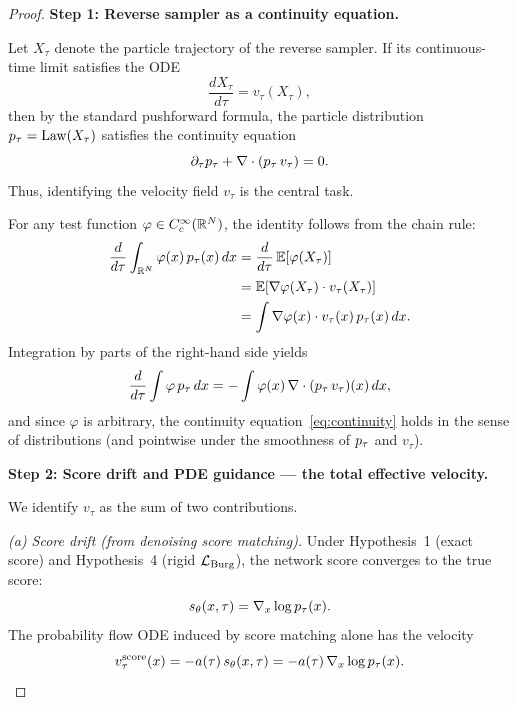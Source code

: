 \begin{proof}

\medskip
\noindent\textbf{Step 1: Reverse sampler as a continuity equation.}

Let $X_{\tau}$ denote the particle trajectory of the reverse sampler.
If its continuous-time limit satisfies the ODE
\begin{equation}
\frac{d X_{\tau}}{d\tau} = v_{\tau}(X_{\tau}),
\end{equation}
then by the standard pushforward formula, the particle distribution
$p_{\tau} = \mathrm{Law}(X_{\tau})$ satisfies the continuity equation
\begin{equation}
\label{eq:continuity}
\partial_{\tau} p_{\tau} + \nabla \cdot (p_{\tau}\,v_{\tau}) = 0.
\end{equation}
Thus, identifying the velocity field $v_{\tau}$ is the central task.

For any test function $\varphi \in C_{c}^{\infty}(\mathbb{R}^{N})$, the identity follows from the
chain rule:
\begin{align}
\frac{d}{d\tau} \int_{\mathbb{R}^{N}} \varphi(x)\,p_{\tau}(x)\,dx
  &= \frac{d}{d\tau}\,\mathbb{E}[\varphi(X_{\tau})] \notag\\
  &= \mathbb{E}[\nabla\varphi(X_{\tau}) \cdot v_{\tau}(X_{\tau})] \notag\\
  &= \int \nabla\varphi(x) \cdot v_{\tau}(x)\,p_{\tau}(x)\,dx.
\end{align}
Integration by parts of the right-hand side yields
\begin{equation}
\frac{d}{d\tau} \int \varphi\,p_{\tau}\,dx
  = - \int \varphi(x)\,\nabla\cdot(p_{\tau}\,v_{\tau})(x)\,dx,
\end{equation}
and since $\varphi$ is arbitrary, the continuity equation~\eqref{eq:continuity} holds in
the sense of distributions (and pointwise under the smoothness of $p_{\tau}$ and $v_{\tau}$).

\medskip
\noindent\textbf{Step 2: Score drift and PDE guidance --- the total effective velocity.}

We identify $v_{\tau}$ as the sum of two contributions.

\smallskip
\noindent\textit{(a)  Score drift (from denoising score matching).}
Under Hypothesis~1 (exact score) and Hypothesis~4 (rigid $\mathcal{L}_{\mathrm{Burg}}$), the network score
converges to the true score:
\begin{equation}
s_{\theta}(x,\tau) = \nabla_x \log p_{\tau}(x).
\end{equation}
The probability flow ODE induced by score matching alone has the velocity
\begin{equation}
\label{eq:score-vel}
v_{\tau}^{\mathrm{score}}(x) = -a(\tau)\,s_{\theta}(x,\tau) = -a(\tau)\,\nabla_x\log p_{\tau}(x).
\end{equation}


\end{proof}
